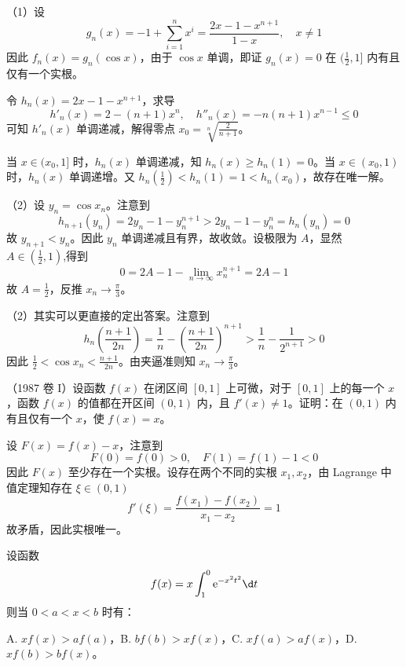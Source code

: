\begin{solution}
	（1）设
	\[ g_n(x) =  - 1 + \sum_{i=1}^n x^i = \frac{2x - 1 - x^{n+1}}{1 - x}, \quad x \neq 1 \]
	因此 $f_n(x) = g_n(\cos x)$，由于 $\cos x$ 单调，即证 $g_n(x) = 0$ 在 $(\frac{1}{2}, 1]$ 内有且仅有一个实根。


	令 $h_n(x) = 2x - 1 - x^{n+1}$，求导
	\[ h'_n(x) = 2 - (n + 1)x^n, \quad h''_n(x) = - n(n+1) x^{n-1} \leqslant 0 \]
	可知 $h'_n(x)$ 单调递减，解得零点 $x_0 = \sqrt[n]{\frac{2}{n + 1}}$。

	当 $x \in (x_0, 1]$ 时，$h_n(x)$ 单调递减，知 $h_n(x) \geqslant h_n(1) = 0$。当 $x \in (x_0, 1)$ 时，$h_n(x)$ 单调递增。又 $h_n(\frac{1}{2}) <  h_n(1) = 1 < h_n(x_0)$，故存在唯一解。

	（2）设 $y_n = \cos x_n$。注意到
	\[ h_{n+1}(y_n) = 2 y_n - 1 - y_{n}^{n+1} > 2 y_n - 1 - y_{n}^n = h_n(y_n) = 0 \]
	故 $y_{n+1} < y_{n}$。因此 $y_n$ 单调递减且有界，故收敛。设极限为 $A$，显然 $A \in (\frac{1}{2}, 1)$,得到
	\[ 0 = 2A - 1 - \lim_{n \to \infty} x_n^{n+1} = 2A - 1 \]
	故 $A = \frac{1}{2}$，反推 $x_n \to \frac{\pi}{3}$。

	（2）其实可以更直接的定出答案。注意到
	\[ h_n\left(\frac{n + 1}{2n}\right) = \frac{1}{n} - \left(\frac{n + 1}{2n}\right)^{n+1} > \frac{1}{n} - \frac{1}{2^{n+1}} > 0 \]
	因此 $\frac{1}{2} < \cos x_n < \frac{n + 1}{2n}$。由夹逼准则知 $x_n \to \frac{\pi}{3}$。

\end{solution}

\begin{problem}[000021]
（1987 卷 I）设函数 $f(x)$ 在闭区间 $[0,1]$ 上可微，对于 $[0, 1]$ 上的每一个 $x$，函数 $f(x)$ 的值都在开区间 $(0, 1)$ 内，且 $f'(x) \neq 1$。证明：在 $(0, 1)$ 内有且仅有一个 $x$，使 $f(x) = x$。
\end{problem}

\begin{solution}
	设 $F(x) = f(x) - x$，注意到
	\[ F(0) = f(0) > 0, \quad F(1) = f(1) - 1 < 0 \]
	因此 $F(x)$ 至少存在一个实根。设存在两个不同的实根 $x_1, x_2$，由 Lagrange 中值定理知存在 $\xi \in (0, 1)$
	\[ f'(\xi) = \frac{f(x_1) - f(x_2)}{x_1 - x_2} = 1 \]
	故矛盾，因此实根唯一。
\end{solution}

\begin{problem}[000022]
设函数
\[ f(x) = x \int_{1}^{0} \ee^{-x^2t^2} \d t \]
则当 $0<a<x<b$ 时有：

A. $xf(x) > af(a)$，B. $bf(b) > x f(x)$，C. $xf(a) > af(x)$，D. $xf(b) > bf(x)$。
\end{problem}


